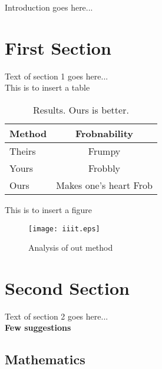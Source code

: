 
Introduction goes here...


\section{First Section}
\label{sec:intro-sec1name}

Text of section 1 goes here... \\

This is to insert a table \\

\begin{table}[h]
\begin{center}
    \begin{tabular}{|l|c|}
        \hline
        Method & Frobnability \\
        \hline \hline
        Theirs & Frumpy \\
        Yours & Frobbly \\
        Ours & Makes one's heart Frob\\
    \hline
    \end{tabular}
    \caption{Results. Ours is better.}
    \label{table:results}
\end{center}
\end{table}

This is to insert a figure \\

\begin{figure}[h]
    \centering
    \texttt{[image: iiit.eps]}
    \caption{Analysis of out method}
    \label{fig:analysis}
\end{figure}
\newpage


\section{Second Section}

Text of section 2 goes here... \\

{\bf Few suggestions}

\subsection{Mathematics}


